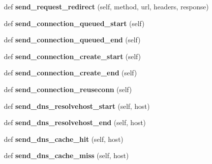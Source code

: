 \begin{DoxyCompactItemize}
def {\bfseries send\+\_\+request\+\_\+redirect} (self, method, url, headers, response)
\item 
\mbox{\label{classaiohttp_1_1tracing_1_1_trace_a74d69e6509d15230edbc95a8b88412d3}} 
def {\bfseries send\+\_\+connection\+\_\+queued\+\_\+start} (self)
\item 
\mbox{\label{classaiohttp_1_1tracing_1_1_trace_ab48295408eea3a5d837f2cd096242580}} 
def {\bfseries send\+\_\+connection\+\_\+queued\+\_\+end} (self)
\item 
\mbox{\label{classaiohttp_1_1tracing_1_1_trace_ab2b31a09211c3dac359c21ed1f2d0cbd}} 
def {\bfseries send\+\_\+connection\+\_\+create\+\_\+start} (self)
\item 
\mbox{\label{classaiohttp_1_1tracing_1_1_trace_abfcb6361c65c20417873162bb54572dc}} 
def {\bfseries send\+\_\+connection\+\_\+create\+\_\+end} (self)
\item 
\mbox{\label{classaiohttp_1_1tracing_1_1_trace_a6109e99dc6b556998db426397e225544}} 
def {\bfseries send\+\_\+connection\+\_\+reuseconn} (self)
\item 
\mbox{\label{classaiohttp_1_1tracing_1_1_trace_af266798ba0985e5bb8fd2d581c04080d}} 
def {\bfseries send\+\_\+dns\+\_\+resolvehost\+\_\+start} (self, host)
\item 
\mbox{\label{classaiohttp_1_1tracing_1_1_trace_acd7ac8c5e62f78e7b775f9f9355e21c5}} 
def {\bfseries send\+\_\+dns\+\_\+resolvehost\+\_\+end} (self, host)
\item 
\mbox{\label{classaiohttp_1_1tracing_1_1_trace_a098401acdfc1f5f23dc9776a2061fb65}} 
def {\bfseries send\+\_\+dns\+\_\+cache\+\_\+hit} (self, host)
\item 
\mbox{\label{classaiohttp_1_1tracing_1_1_trace_a65332996454dbcf74fef4490901e4591}} 
def {\bfseries send\+\_\+dns\+\_\+cache\+\_\+miss} (self, host)
\end{DoxyCompactItemize}


